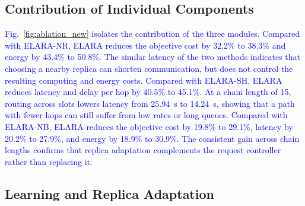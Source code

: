\documentclass[10pt, conference, letterpaper]{IEEEtran}
\begin{document}
\subsection{Contribution of Individual Components}

\textcolor{blue}{Fig.~\ref{fig:ablation_new} isolates the contribution of the three modules. Compared with ELARA-NR, ELARA reduces the objective cost by 32.2\% to 38.3\% and energy by 43.4\% to 50.8\%. The similar latency of the two methods indicates that choosing a nearby replica can shorten communication, but does not control the resulting computing and energy costs. Compared with ELARA-SH, ELARA reduces latency and delay per hop by 40.5\% to 45.1\%. At a chain length of 15, routing across slots lowers latency from 25.94~s to 14.24~s, showing that a path with fewer hops can still suffer from low rates or long queues. Compared with ELARA-NB, ELARA reduces the objective cost by 19.8\% to 29.1\%, latency by 20.2\% to 27.9\%, and energy by 18.9\% to 30.9\%. The consistent gain across chain lengths confirms that replica adaptation complements the request controller rather than replacing it.}


\subsection{Learning and Replica Adaptation}
\end{document}

